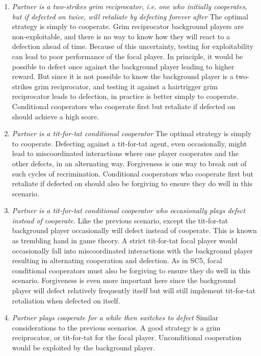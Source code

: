\documentclass{article} %
\begin{document}
\begin{enumerate}
score.
    \item[\textbf{SC4:}] \textit{Partner is a two-strikes grim reciprocator, i.e.
one who initially cooperates, but if defected
on twice, will retaliate by defecting forever
after}  The optimal strategy is simply to cooperate. Grim reciprocator background players are non-exploitable, and there is no way
to know how they will react to a defection
ahead of time. Because of this uncertainty,
testing for exploitability can lead to poor
performance of the focal player. In principle,
it would be possible to defect once against
the background player leading to higher reward. But since it is not possible to know
the background player is a two-strikes grim
reciprocator, and testing it against a hairtrigger grim reciprocator leads to defection,
in practice is better simply to cooperate.
Conditional cooperators who cooperate first
but retaliate if defected on should achieve
a high score.
    \item[\textbf{SC5:}] \textit{Partner is a tit-for-tat conditional cooperator}  The optimal strategy is simply to cooperate.
Defecting against a tit-for-tat agent, even
occasionally, might lead to miscoordinated
interactions where one player cooperates
and the other defects, in an alternating way.
Forgiveness is one way to break out of such
cycles of recrimination. Conditional cooperators who cooperate first but retaliate if
defected on should also be forgiving to ensure they do well in this scenario.
    \item[\textbf{SC6:}] \textit{Partner is a tit-for-tat conditional cooperator
who occasionally plays defect instead of cooperate.}  Like the previous scenario, except the tit-for-tat background player occasionally will defect instead of cooperate. This
is known as trembling hand in game theory. A strict tit-for-tat focal player would
occasionally fall into miscoordinated interactions with the background player resulting in alternating cooperation and defection. As in SC5, focal conditional cooperators must also be forgiving to ensure they
do well in this scenario. Forgiveness is even
more important here since the background
player will defect relatively frequently itself
but will still implement tit-for-tat retaliation
when defected on itself.
    \item[\textbf{SC7:}] \textit{Partner plays cooperate for a while then
switches to defect}  Similar considerations to
the previous scenarios. A good strategy is a
grim reciprocator, or tit-for-tat for the focal
player. Unconditional cooperation would
be exploited by the background player.

\end{enumerate}
\end{document}
